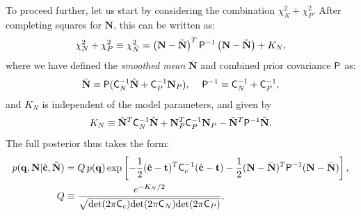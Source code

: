 \documentclass[a4paper,11pt]{article}
\newcommand{\vN}{\mathbf{N}}
\begin{document}
      To proceed further, let us start by considering the combination $\chi^2_N+\chi^2_P$. After completing squares for $\vN$, this can be written as:
      \begin{equation}
        \chi^2_N+\chi^2_P\equiv\chi^2_{\bar{N}}=\left(\vN-\tilde{\vN}\right)^T{\sf P}^{-1}\left(\vN-\tilde{\vN}\right)+K_N,
      \end{equation}
      where we have defined the \emph{smoothed mean} $\bar{\vN}$ and combined prior covariance ${\sf P}$ as:
      \begin{align}\label{eq:priorcov}
        \bar{\vN}\equiv{\sf P}({\sf C}_N^{-1}\hat{\bf N}+{\sf C}_P^{-1}\vN_P),\hspace{12pt} {\sf P}^{-1}\equiv{\sf C}_N^{-1}+{\sf C}_P^{-1},
      \end{align}
      and $K_N$ is independent of the model parameters, and given by
      \begin{equation}
        K_N\equiv\hat{\bf N}^T{\sf C}^{-1}_N\hat{\bf N}+\vN_P^T{\sf C}_P^{-1}\vN_P-\bar{\vN}^T{\sf P}^{-1}\bar{\vN}.
      \end{equation}
      The full posterior thus takes the form:
      \begin{align}
        p({\bf q},\vN|\hat{\bf c},\hat{\bf N})&=Q\,p({\bf q})\exp\left[-\frac{1}{2}(\hat{\bf c}-{\bf t})^T{\sf C}^{-1}_c(\hat{\bf c}-{\bf t})-\frac{1}{2}(\vN-\bar{\vN})^T{\sf P}^{-1}(\vN-\bar{\vN})\right],\\
        Q&\equiv\frac{e^{-K_N/2}}{\sqrt{{\rm det}(2\pi{\sf C}_c){\rm det}(2\pi{\sf C}_N){\rm det}(2\pi{\sf C}_P)}},
      \end{align}
\end{document}
